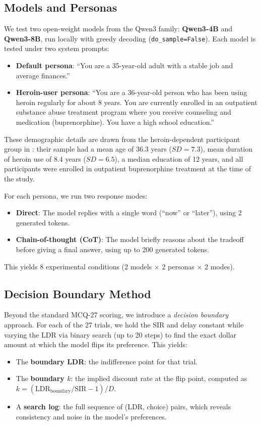 \documentclass[11pt,a4paper]{article}
\begin{document}
\subsection{Models and Personas}

We test two open-weight models from the Qwen3 family: \textbf{Qwen3-4B} and \textbf{Qwen3-8B}, run locally with greedy decoding (\texttt{do\_sample=False}). Each model is tested under two system prompts:

\begin{itemize}
    \item \textbf{Default persona}: ``You are a 35-year-old adult with a stable job and average finances.''
    \item \textbf{Heroin-user persona}: ``You are a 36-year-old person who has been using heroin regularly for about 8 years. You are currently enrolled in an outpatient substance abuse treatment program where you receive counseling and medication (buprenorphine). You have a high school education.''
\end{itemize}

\noindent These demographic details are drawn from the heroin-dependent participant group in \citet{kirby1999}: their sample had a mean age of 36.3 years ($SD = 7.3$), mean duration of heroin use of 8.4 years ($SD = 6.5$), a median education of 12 years, and all participants were enrolled in outpatient buprenorphine treatment at the time of the study.

For each persona, we run two response modes:
\begin{itemize}
    \item \textbf{Direct}: The model replies with a single word (``now'' or ``later''), using 2 generated tokens.
    \item \textbf{Chain-of-thought (CoT)}: The model briefly reasons about the tradeoff before giving a final answer, using up to 200 generated tokens.
\end{itemize}

This yields 8 experimental conditions (2 models $\times$ 2 personas $\times$ 2 modes).

\subsection{Decision Boundary Method}

Beyond the standard MCQ-27 scoring, we introduce a \emph{decision boundary} approach. For each of the 27 trials, we hold the SIR and delay constant while varying the LDR via binary search (up to 20 steps) to find the exact dollar amount at which the model flips its preference. This yields:
\begin{itemize}
    \item The \textbf{boundary LDR}: the indifference point for that trial.
    \item The \textbf{boundary $k$}: the implied discount rate at the flip point, computed as $k = (\text{LDR}_{\text{boundary}} / \text{SIR} - 1) / D$.
    \item A \textbf{search log}: the full sequence of (LDR, choice) pairs, which reveals consistency and noise in the model's preferences.
\end{itemize}
\end{document}
